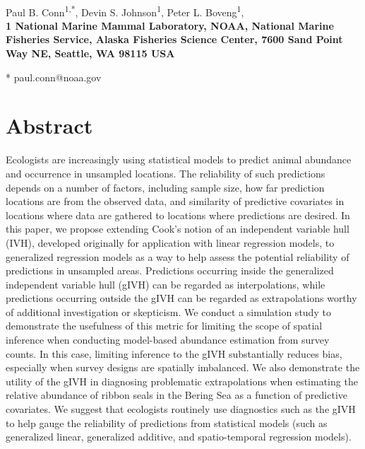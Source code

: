 \documentclass[10pt,letterpaper]{article}
\date{}
\begin{document}
\vspace*{0.35in}

\begin{flushleft}
{\Large
\textbf{}
}
\newline
\\
Paul B. Conn\textsuperscript{1,*},
Devin S. Johnson\textsuperscript{1},
Peter L. Boveng\textsuperscript{1},
\\
\bigskip
\bf{1} National Marine Mammal Laboratory, NOAA, National Marine Fisheries Service,
Alaska Fisheries Science Center, 7600 Sand Point Way NE, Seattle,
WA 98115 USA
\\
\bigskip

* paul.conn@noaa.gov

\end{flushleft}
\section*{Abstract}
Ecologists are increasingly using statistical models to predict animal abundance and occurrence in unsampled locations. The reliability of such predictions depends on a number of factors, including sample size, how far prediction locations are from the observed data, and similarity of predictive covariates in locations where data are gathered to locations where predictions are desired.  In this paper, we propose extending Cook's notion of an independent variable hull (IVH), developed originally for application with linear regression models, to generalized regression models as a way to help assess the potential reliability of predictions in unsampled areas.  Predictions occurring inside the generalized independent variable hull (gIVH) can be regarded as interpolations, while predictions occurring outside the gIVH can be regarded as extrapolations worthy of additional investigation or skepticism. We conduct a simulation study to demonstrate the usefulness of this metric for limiting the scope of spatial inference when conducting model-based abundance estimation from survey counts.  In this case, limiting inference to the gIVH substantially reduces bias, especially when survey designs are spatially imbalanced.  We also demonstrate the utility of the gIVH in diagnosing problematic extrapolations when estimating the relative abundance of ribbon seals in the Bering Sea as a function of predictive covariates.  We suggest that ecologists routinely use diagnostics such as the gIVH to help gauge the reliability of predictions from statistical models (such as generalized linear, generalized additive, and spatio-temporal regression models).
\linenumbers
\end{document}

